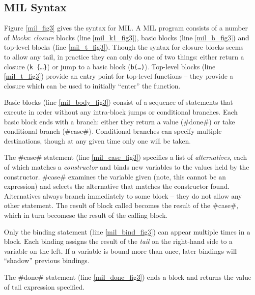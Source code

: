 \documentclass[12pt]{report}
\begin{document}
\subsection{MIL Syntax}

Figure \ref{mil_fig3} gives the syntax for MIL.  A MIL program
consists of a number of \emph{blocks}: \emph{closure} blocks (line
\ref{mil_k1_fig3}), basic blocks (line \ref{mil_b_fig3}) and top-level
blocks (line \ref{mil_t_fig3}). Though the syntax for closure blocks
seems to allow any tail, in practice they can only do one of two
things: either return a closure (\texttt{k \{\dots\}}) or jump to a
basic block (\texttt{b(\dots)}). Top-level blocks (line
\ref{mil_t_fig3}) provide an entry point for top-level functions --
they provide a closure which can be used to initially ``enter'' the
function.

\afterpage{\clearpage{}\clearpage}

Basic blocks (line \ref{mil_body_fig3}) consist of a sequence of statements that
execute in order without any intra-block jumps or conditional
branches. Each basic block ends with a branch: either they return a
value (#done#) or take conditional branch (#case#). Conditional
branches can specify multiple destinations, though at any given time
only one will be taken.

The #case# statement (line \ref{mil_case_fig3}) specifies a list of
\emph{alternatives}, each of which matches a \emph{constructor} and
binds new variables to the values held by the constructor. #case#
examines the variable given (note, this cannot be an expression) and
selects the alternative that matches the constructor
found. Alternatives always branch immediately to some block -- they do
not allow any other statement. The result of block called becomes the
result of the #case#, which in turn becomese the result of the calling
block.

Only the binding statement (line \ref{mil_bind_fig3}) can appear multiple
times in a block. Each binding assigns the result of the \emph{tail}
on the right-hand side to a variable on the left. If a variable is
bound more than once, later bindings will ``shadow'' previous
bindings.

The #done# statement (line \ref{mil_done_fig3}) ends a block and returns
the value of tail expression specified.
\end{document}
